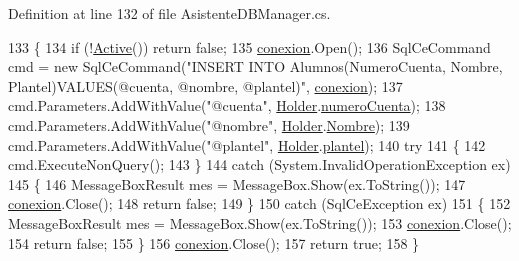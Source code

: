 Definition at line 132 of file Asistente\-D\-B\-Manager.\-cs.


\begin{DoxyCode}
133         \{
134             \textcolor{keywordflow}{if} (!\hyperlink{class_asistencias__wpf_1_1_asistente_d_b_manager_ae48d582f5f9db4788e0f5f7c1bfe9b6e}{Active}()) \textcolor{keywordflow}{return} \textcolor{keyword}{false};
135             \hyperlink{class_asistencias__wpf_1_1_asistente_d_b_manager_a4ed268d53c358adfb5ca0185439bd6cf}{conexion}.Open();
136             SqlCeCommand cmd = \textcolor{keyword}{new} SqlCeCommand(\textcolor{stringliteral}{"INSERT INTO Alumnos(NumeroCuenta, Nombre,
       Plantel)VALUES(@cuenta, @nombre, @plantel)"}, \hyperlink{class_asistencias__wpf_1_1_asistente_d_b_manager_a4ed268d53c358adfb5ca0185439bd6cf}{conexion});
137             cmd.Parameters.AddWithValue(\textcolor{stringliteral}{"@cuenta"}, \hyperlink{class_asistencias__wpf_1_1_asistente_d_b_manager_a4f73db2d92f913ccc8862126717968cd}{Holder}.\hyperlink{class_asistencias__wpf_1_1_asistente_a6d2aa009497445d62699e3c9d402ca78}{numeroCuenta});
138             cmd.Parameters.AddWithValue(\textcolor{stringliteral}{"@nombre"}, \hyperlink{class_asistencias__wpf_1_1_asistente_d_b_manager_a4f73db2d92f913ccc8862126717968cd}{Holder}.\hyperlink{class_asistencias__wpf_1_1_asistente_a321714ee92e497c61236fedca32912cb}{Nombre});
139             cmd.Parameters.AddWithValue(\textcolor{stringliteral}{"@plantel"}, \hyperlink{class_asistencias__wpf_1_1_asistente_d_b_manager_a4f73db2d92f913ccc8862126717968cd}{Holder}.\hyperlink{class_asistencias__wpf_1_1_asistente_a4346dd7e16f0e8ef5de301d5e2b0439b}{plantel});
140             \textcolor{keywordflow}{try}
141             \{
142                 cmd.ExecuteNonQuery();
143             \}
144             \textcolor{keywordflow}{catch} (System.InvalidOperationException ex)
145             \{
146                 MessageBoxResult mes = MessageBox.Show(ex.ToString());
147                 \hyperlink{class_asistencias__wpf_1_1_asistente_d_b_manager_a4ed268d53c358adfb5ca0185439bd6cf}{conexion}.Close();
148                 \textcolor{keywordflow}{return} \textcolor{keyword}{false};
149             \}
150             \textcolor{keywordflow}{catch} (SqlCeException ex)
151             \{
152                 MessageBoxResult mes = MessageBox.Show(ex.ToString());
153                 \hyperlink{class_asistencias__wpf_1_1_asistente_d_b_manager_a4ed268d53c358adfb5ca0185439bd6cf}{conexion}.Close();
154                 \textcolor{keywordflow}{return} \textcolor{keyword}{false};
155             \}
156             \hyperlink{class_asistencias__wpf_1_1_asistente_d_b_manager_a4ed268d53c358adfb5ca0185439bd6cf}{conexion}.Close();
157             \textcolor{keywordflow}{return} \textcolor{keyword}{true};
158         \}
\end{DoxyCode}
